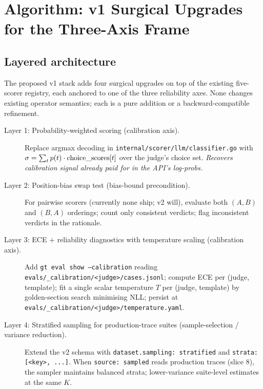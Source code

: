 \section{Algorithm: v1 Surgical Upgrades for the Three-Axis Frame}
\label{sec:algorithm}


\subsection{Layered architecture}

The proposed v1 stack adds four surgical upgrades on top of the
existing five-scorer registry, each anchored to one of the three
reliability axes. None changes existing operator semantics; each is
a pure addition or a backward-compatible refinement.

\begin{description}
  \item[Layer 1: Probability-weighted scoring (calibration axis).]
        Replace argmax decoding in \texttt{internal/scorer/llm/classifier.go}
        with $\sigma = \sum_t p(t) \cdot \mathrm{choice\_scores}[t]$
        over the judge's choice set. \emph{Recovers calibration signal
        already paid for in the API's log-probs.}
  \item[Layer 2: Position-bias swap test (bias-bound precondition).]
        For pairwise scorers (currently none ship; v2 will), evaluate
        both $(A, B)$ and $(B, A)$ orderings; count only consistent
        verdicts; flag inconsistent verdicts in the rationale.
  \item[Layer 3: ECE + reliability diagnostics with temperature
        scaling (calibration axis).] Add \texttt{gt eval show
        --calibration} reading
        \texttt{evals/\_calibration/<judge>/cases.jsonl}; compute ECE
        per (judge, template); fit a single scalar temperature $T$
        per (judge, template) by golden-section search minimising NLL;
        persist at \texttt{evals/\_calibration/<judge>/temperature.yaml}.
  \item[Layer 4: Stratified sampling for production-trace suites
        (sample-selection / variance reduction).]
        Extend the v2 schema with \texttt{dataset.sampling: stratified}
        and \texttt{strata: [<key>, ...]}. When \texttt{source: sampled}
        reads production traces (slice 8), the sampler maintains
        balanced strata; lower-variance suite-level estimates at the
        same $K$.
\end{description}

